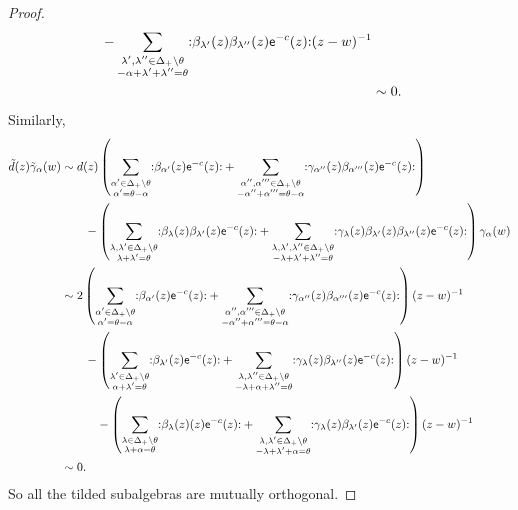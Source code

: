 \documentclass[10pt,a4paper]{amsart}
\numberwithin{equation}{section}
\newcommand{\ee}{\mathsf{e}}   %
\newcommand{\no}[1]{\mathopen{:} #1 \mathclose{:}} %
\newcommand{\proots}{\Delta_+}                                       %
\newcommand{\hroot}{\theta}                                          %
\theoremstyle{plain}
\begin{document}
\begin{proof}
\begin{align}
     - \sum_{\substack{\lambda',\lambda'' \in \proots \setminus \hroot \\ -\alpha+\lambda'+\lambda''=\hroot}} \no{\beta_{\lambda'} (z) \beta_{\lambda''}(z)\ee^{-c}(z)}(z-w)^{-1} \notag\\&\sim 0. \notag
\end{align}
%
Similarly, 
%
\begin{align}
    \tilde{d}(z) \tilde{\gamma}_\alpha(w) &\sim d(z) \left(\sum_{\substack{\alpha' \in \proots \setminus \hroot \\ \alpha'=\hroot-\alpha}}\no{\beta_{\alpha'}(z)\ee^{-c}(z)}
    + \sum_{\substack{\alpha'',\alpha''' \in \proots \setminus \hroot \\ -\alpha''+\alpha'''=\hroot-\alpha}}\no{\gamma_{\alpha''}(z)\beta_{\alpha'''}(z)\ee^{-c}(z)} \right) \\
    &\hspace{2em} -\left( \sum_{\substack{\lambda,\lambda' \in \proots \setminus \hroot \\ \lambda+\lambda'=\hroot}} \no{\beta_\lambda (z) \beta_{\lambda'}(z)\ee^{-c}(z)} 
    +\sum_{\substack{\lambda,\lambda',\lambda'' \in \proots \setminus \hroot \\ -\lambda+\lambda'+\lambda''=\hroot}} \no{\gamma_\lambda(z) \beta_{\lambda'} (z) \beta_{\lambda''}(z)\ee^{-c}(z)}\right) \gamma_\alpha(w) \notag\\
    &\sim 2 \left(\sum_{\substack{\alpha' \in \proots \setminus \hroot \\ \alpha'=\hroot-\alpha}}\no{\beta_{\alpha'}(z)\ee^{-c}(z)}
    + \sum_{\substack{\alpha'',\alpha''' \in \proots \setminus \hroot \\ -\alpha''+\alpha'''=\hroot-\alpha}}\no{\gamma_{\alpha''}(z)\beta_{\alpha'''}(z)\ee^{-c}(z)} \right)(z-w)^{-1} \notag\\
    &\hspace{2em} -\left( \sum_{\substack{\lambda' \in \proots \setminus \hroot \\ \alpha+\lambda'=\hroot}} \no{ \beta_{\lambda'}(z)\ee^{-c}(z)} 
    +\sum_{\substack{\lambda,\lambda'' \in \proots \setminus \hroot \\ -\lambda+\alpha+\lambda''=\hroot}} \no{\gamma_\lambda(z)  \beta_{\lambda''}(z)\ee^{-c}(z)}\right) (z-w)^{-1}
    \notag\\
    &\hspace{3em} -\left( \sum_{\substack{\lambda \in \proots \setminus \hroot \\ \lambda+\alpha=\hroot}} \no{\beta_\lambda (z) (z)\ee^{-c}(z)} 
    +\sum_{\substack{\lambda,\lambda' \in \proots \setminus \hroot \\ -\lambda+\lambda'+\alpha=\hroot}} \no{\gamma_\lambda(z) \beta_{\lambda'} (z) \ee^{-c}(z)}\right) (z-w)^{-1} \notag\\
    &\sim 0. \notag
\end{align}
%
So all the tilded subalgebras are mutually orthogonal. 


\end{proof}
\end{document}
